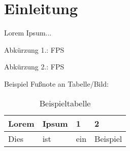 \documentclass[../Document.tex]{subfiles}
\begin{document}
\section{Einleitung}
Lorem Ipsum...

Abkürzung 1.:
\ac{FPS}

Abkürzung 2.:
\ac{FPS}

Beispiel Fußnote an Tabelle/Bild:

\begin{table}[!htb]
\begin{tabular}{|p{3cm}|p{3cm}|p{3cm}|p{3cm}|}  \hline\hline
   \textbf{Lorem} & \textbf{Ipsum} & \textbf{1} & \textbf{2} \\ \hline
    Dies & ist & ein & Beispiel \\                                            \hline
\end{tabular}
\caption[Beispieltabelle]{Beispieltabelle\protect\footnotemark}
\end{table}
\end{document}
